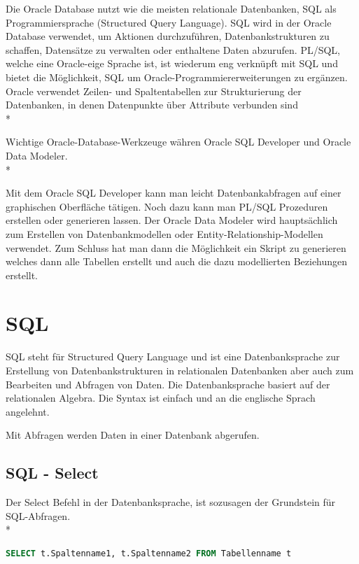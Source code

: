 Die Oracle Database nutzt wie die meisten relationale Datenbanken, SQL als Programmiersprache (Structured Query Language).
SQL wird in der Oracle Database verwendet, um Aktionen durchzuführen, Datenbankstrukturen zu schaffen, Datensätze zu verwalten oder enthaltene Daten abzurufen. 
PL/SQL, welche eine Oracle-eige Sprache ist, ist wiederum eng verknüpft mit SQL und bietet die Möglichkeit, SQL um Oracle-Programmiererweiterungen zu ergänzen. 
Oracle verwendet Zeilen- und Spaltentabellen zur Strukturierung der Datenbanken, in denen Datenpunkte über Attribute verbunden sind \cite{OracleDB} \\*

Wichtige Oracle-Database-Werkzeuge währen Oracle SQL Developer und Oracle Data Modeler. \\*

Mit dem Oracle SQL Developer kann man leicht Datenbankabfragen auf einer graphischen Oberfläche tätigen. Noch dazu kann man PL/SQL Prozeduren erstellen oder generieren lassen.
Der Oracle Data Modeler wird hauptsächlich zum Erstellen von Datenbankmodellen oder Entity-Relationship-Modellen verwendet. Zum Schluss hat man dann die Möglichkeit ein Skript 
zu generieren welches dann alle Tabellen erstellt und auch die dazu modellierten Beziehungen erstellt.

\section{SQL}
\author{David Ignjatovic}

SQL steht für Structured Query Language und ist eine Datenbanksprache zur Erstellung von Datenbankstrukturen in relationalen Datenbanken 
aber auch zum Bearbeiten und Abfragen von Daten. Die Datenbanksprache basiert auf der relationalen Algebra. Die Syntax ist einfach und an die englische Sprach angelehnt. 

Mit Abfragen werden Daten in einer Datenbank abgerufen. \cite{SQL}

\subsection{SQL - Select}

Der Select Befehl in der Datenbanksprache, ist sozusagen der Grundstein für SQL-Abfragen.  \\*

\begin{lstlisting}[language=SQL,caption=Sql Select,label=lst:impl:foo]
SELECT t.Spaltenname1, t.Spaltenname2 FROM Tabellenname t
\end{lstlisting}

